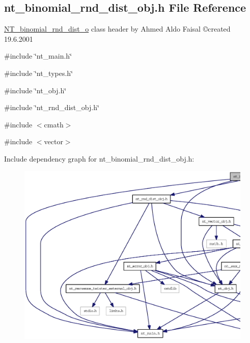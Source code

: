 \subsection{nt\_\-binomial\_\-rnd\_\-dist\_\-obj.h File Reference}
\label{nt__binomial__rnd__dist__obj_8h}



\begin{DoxyItemize}
\item \hyperlink{class_n_t__binomial__rnd__dist__o}{NT\_\-binomial\_\-rnd\_\-dist\_\-o} class header by Ahmed Aldo Faisal \copyright created 19.6.2001 
\end{DoxyItemize} 


{\ttfamily \#include \char`\"{}nt\_\-main.h\char`\"{}}\par
{\ttfamily \#include \char`\"{}nt\_\-types.h\char`\"{}}\par
{\ttfamily \#include \char`\"{}nt\_\-obj.h\char`\"{}}\par
{\ttfamily \#include \char`\"{}nt\_\-rnd\_\-dist\_\-obj.h\char`\"{}}\par
{\ttfamily \#include $<$cmath$>$}\par
{\ttfamily \#include $<$vector$>$}\par
Include dependency graph for nt\_\-binomial\_\-rnd\_\-dist\_\-obj.h:
\nopagebreak
\begin{figure}[H]
\begin{center}
\leavevmode
\includegraphics[width=400pt]{nt__binomial__rnd__dist__obj_8h__incl}
\end{center}
\end{figure}
